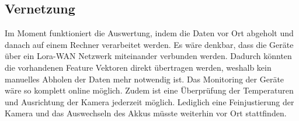 \subsection{Vernetzung}
Im Moment funktioniert die Auswertung, indem die Daten vor Ort abgeholt und danach auf einem Rechner verarbeitet werden. Es wäre denkbar, dass die Geräte über ein Lora-WAN Netzwerk miteinander verbunden werden. Dadurch könnten die vorhandenen Feature Vektoren direkt übertragen werden, weshalb kein manuelles Abholen der Daten mehr notwendig ist. Das Monitoring der Geräte wäre so komplett online möglich. Zudem ist eine Überprüfung der Temperaturen und Ausrichtung der Kamera jederzeit möglich. Lediglich eine Feinjustierung der Kamera und das Auswechseln des Akkus müsste weiterhin vor Ort stattfinden.